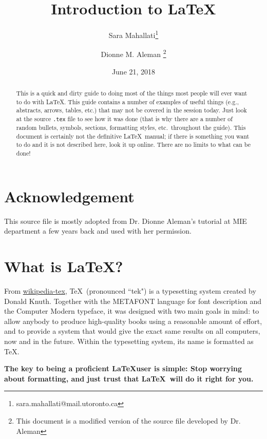 \documentclass[12pt]{article}
\title{Introduction to \LaTeX}
\author[1,2]{Sara Mahallati\thanks{sara.mahallati@mail.utoronto.ca}}
\author[3]{Dionne M. Aleman \thanks{This document is a modified version of the source file developed by Dr. Aleman}}
\affil[1]{Institute of Biomaterials and Biomedical Engineering, University of Toronto, Canada}
\affil[3]{Department of Mechanical and Industrial Engineering, University of Toronto}
\affil[2]{Krembil Research Institute, University Health Network, Toronto, Canada}
\date{June 21, 2018}
\begin{document}
\maketitle

\begin{abstract}
This is a quick and dirty guide to doing most of the things most people will ever want to do with \LaTeX. This guide contains a number of examples of useful things (e.g., abstracts, arrows, tables, etc.) that may not be covered in the session today. Just look at the source \texttt{.tex} file to see how it was done (that is why there are a number of random bullets, symbols, sections, formatting styles, etc.\ throughout the guide). This document is certainly not the definitive \LaTeX\ manual; if there is something you want to do and it is not described here, look it up online. There are no limits to what can be done!  
\end{abstract}

\newpage

\tableofcontents

\newpage

\section*{Acknowledgement} %
This source file is mostly adopted from Dr. Dionne Aleman's tutorial at MIE department a few years back and used with her permission. 

\section{What is \LaTeX ?} \label{sec:intro}

From \href{https://en.wikipedia.org/wiki/TeX}{wikipedia-tex}, \TeX\ (pronounced ``tek") is a typesetting system created by Donald Knuth. Together with the METAFONT language for font description and the Computer Modern typeface, it was designed with two main goals in mind: to allow anybody to produce high-quality books using a reasonable amount of effort, and to provide a system that would give the exact same results on all computers, now and in the future. Within the typesetting system, its name is formatted as \TeX.


\textbf{The key to being a proficient \LaTeX user is simple: Stop worrying about formatting, and just trust that \LaTeX\ will do it right for you.}
\end{document}
